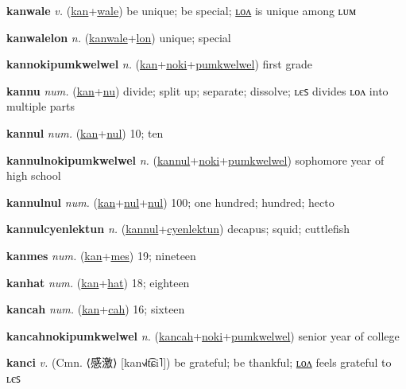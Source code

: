 \textbf{\hypertarget{kanwale}{kanwale}} \textit{v.} (\hyperlink{kan}{kan}+\allowbreak \hyperlink{wale}{wale})
be unique; be special; \hyperlink{kanwalelon}{ʟᴏᴧ} is unique among ʟᴜᴍ

\textbf{\hypertarget{kanwalelon}{kanwalelon}} \textit{n.} (\hyperlink{kanwale}{kanwale}+\allowbreak \hyperlink{lon}{lon})
unique; special

\textbf{\hypertarget{kannokipumkwelwel}{kannokipumkwelwel}} \textit{n.} (\hyperlink{kan}{kan}+\allowbreak \hyperlink{noki}{noki}+\allowbreak \hyperlink{pumkwelwel}{pumkwelwel})
first grade

\textbf{\hypertarget{kannu}{kannu}} \textit{num.} (\hyperlink{kan}{kan}+\allowbreak \hyperlink{nu}{nu})
divide; split up; separate; dissolve; ʟєꜱ divides ʟᴏᴧ into multiple parts

\textbf{\hypertarget{kannul}{kannul}} \textit{num.} (\hyperlink{kan}{kan}+\allowbreak \hyperlink{nul}{nul})
10; ten

\textbf{\hypertarget{kannulnokipumkwelwel}{kannulnokipumkwelwel}} \textit{n.} (\hyperlink{kannul}{kannul}+\allowbreak \hyperlink{noki}{noki}+\allowbreak \hyperlink{pumkwelwel}{pumkwelwel})
sophomore year of high school

\textbf{\hypertarget{kannulnul}{kannulnul}} \textit{num.} (\hyperlink{kan}{kan}+\allowbreak \hyperlink{nul}{nul}+\allowbreak \hyperlink{nul}{nul})
100; one hundred; hundred; hecto

\textbf{\hypertarget{kannulcyenlektun}{kannulcyenlektun}} \textit{n.} (\hyperlink{kannul}{kannul}+\allowbreak \hyperlink{cyenlektun}{cyenlektun})
decapus; squid; cuttlefish

\textbf{\hypertarget{kanmes}{kanmes}} \textit{num.} (\hyperlink{kan}{kan}+\allowbreak \hyperlink{mes}{mes})
19; nineteen

\textbf{\hypertarget{kanhat}{kanhat}} \textit{num.} (\hyperlink{kan}{kan}+\allowbreak \hyperlink{hat}{hat})
18; eighteen

\textbf{\hypertarget{kancah}{kancah}} \textit{num.} (\hyperlink{kan}{kan}+\allowbreak \hyperlink{cah}{cah})
16; sixteen

\textbf{\hypertarget{kancahnokipumkwelwel}{kancahnokipumkwelwel}} \textit{n.} (\hyperlink{kancah}{kancah}+\allowbreak \hyperlink{noki}{noki}+\allowbreak \hyperlink{pumkwelwel}{pumkwelwel})
senior year of college

\textbf{\hypertarget{kanci}{kanci}} \textit{v.} (Cmn. ⟨{\chinese{}感激}⟩ [kan˧˩˧t͡ɕi˥])
be grateful; be thankful; \hyperlink{kancilon}{ʟᴏᴧ} feels grateful to ʟєꜱ

